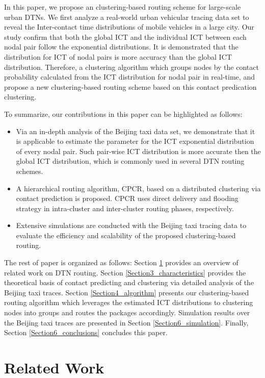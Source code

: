 \documentclass[conference]{IEEEtran}
\begin{document}
In this paper, we propose an clustering-based routing scheme for large-scale urban DTNs.  We first
analyze a real-world urban vehicular tracing data set to reveal the Inter-contact time distributions of mobile vehicles in a large city. Our study confirm that both the global ICT and the individual ICT between each nodal pair follow the exponential distributions.
It is demonstrated that the distribution for ICT of nodal pairs is more accuracy than the global ICT distribution. Therefore, a clustering algorithm which groups nodes by the contact probability calculated from the ICT distribution for nodal pair in real-time, and propose a new clustering-based routing scheme based on this contact predication clustering.

To summarize, our contributions in this paper can be highlighted as follows:
    \begin{itemize}
      \item
         Via an in-depth analysis of the Beijing taxi data set, we demonstrate that it is applicable to estimate the parameter for the ICT exponential distribution of every nodal pair. Such pair-wise ICT distribution is more accurate then the global ICT distribution, which is commonly used in several DTN routing schemes.
      \item
         A hierarchical routing algorithm, CPCR, based on a distributed clustering via contact prediction is proposed.  CPCR uses direct delivery and flooding strategy in intra-cluster and inter-cluster routing phases, respectively.
      \item %
        Extensive simulations are conducted with the Beijing taxi tracing data to evaluate the efficiency and scalability of the proposed clustering-based routing.
    \end{itemize}

The rest of paper is organized as follows: Section \ref{Section2_relatedwork} provides an overview of related work on DTN routing.
Section \ref{Section3_characteristics} provides the theoretical basis of contact predicting and clustering via detailed analysis of the Beijing taxi traces. Section \ref{Section4_algorithm} presents our clustering-based routing algorithm which leverages the estimated ICT distributions to clustering nodes into groups and routes the packages accordingly. Simulation results over the Beijing taxi traces are presented in Section \ref{Section6_simulation}. Finally, Section \ref{Section6_conclusions} concludes this paper.


\section{Related Work}
\label{Section2_relatedwork}
\end{document}
